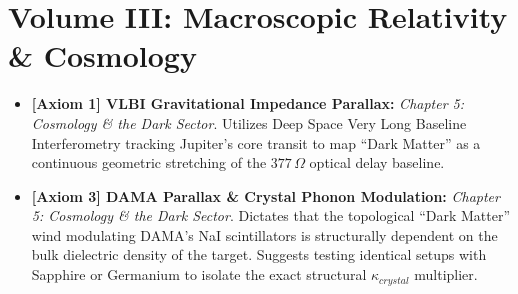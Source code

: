 \section{Volume III: Macroscopic Relativity \& Cosmology}
\begin{itemize}
    \item \textbf{[Axiom 1] VLBI Gravitational Impedance Parallax:} \textit{Chapter 5: Cosmology \& the Dark Sector}. Utilizes Deep Space Very Long Baseline Interferometry tracking Jupiter's core transit to map ``Dark Matter'' as a continuous geometric stretching of the $377\,\Omega$ optical delay baseline.
    \item \textbf{[Axiom 3] DAMA Parallax \& Crystal Phonon Modulation:} \textit{Chapter 5: Cosmology \& the Dark Sector}. Dictates that the topological ``Dark Matter'' wind modulating DAMA's NaI scintillators is structurally dependent on the bulk dielectric density of the target. Suggests testing identical setups with Sapphire or Germanium to isolate the exact structural $\kappa_{crystal}$ multiplier.
\end{itemize}

